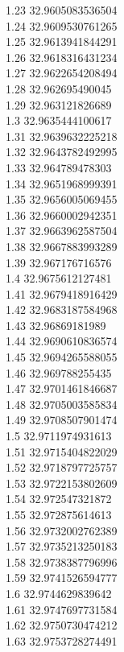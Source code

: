 {1.23	32.9605083536504\\
1.24	32.9609530761265\\
1.25	32.9613941844291\\
1.26	32.9618316431234\\
1.27	32.9622654208494\\
1.28	32.962695490045\\
1.29	32.963121826689\\
1.3	32.9635444100617\\
1.31	32.9639632225218\\
1.32	32.9643782492995\\
1.33	32.964789478303\\
1.34	32.9651968999391\\
1.35	32.9656005069455\\
1.36	32.9660002942351\\
1.37	32.9663962587504\\
1.38	32.9667883993289\\
1.39	32.967176716576\\
1.4	32.9675612127481\\
1.41	32.9679418916429\\
1.42	32.9683187584968\\
1.43	32.96869181989\\
1.44	32.9690610836574\\
1.45	32.9694265588055\\
1.46	32.969788255435\\
1.47	32.9701461846687\\
1.48	32.9705003585834\\
1.49	32.9708507901474\\
1.5	32.9711974931613\\
1.51	32.9715404822029\\
1.52	32.9718797725757\\
1.53	32.9722153802609\\
1.54	32.972547321872\\
1.55	32.972875614613\\
1.56	32.9732002762389\\
1.57	32.9735213250183\\
1.58	32.9738387796996\\
1.59	32.9741526594777\\
1.6	32.9744629839642\\
1.61	32.9747697731584\\
1.62	32.9750730474212\\
1.63	32.9753728274491\\
}
